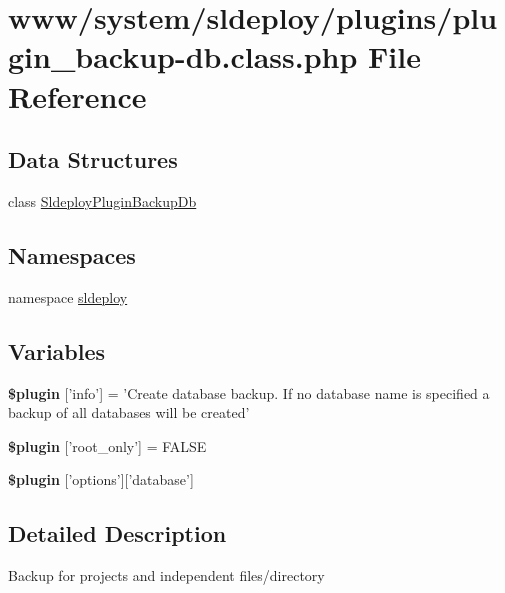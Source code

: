 \hypertarget{plugin__backup-db_8class_8php}{
\section{www/system/sldeploy/plugins/plugin\_\-backup-\/db.class.php File Reference}
\label{plugin__backup-db_8class_8php}
}
\subsection*{Data Structures}
\begin{DoxyCompactItemize}
\item 
class \hyperlink{class_sldeploy_plugin_backup_db}{SldeployPluginBackupDb}
\end{DoxyCompactItemize}
\subsection*{Namespaces}
\begin{DoxyCompactItemize}
\item 
namespace \hyperlink{namespacesldeploy}{sldeploy}
\end{DoxyCompactItemize}
\subsection*{Variables}
\begin{DoxyCompactItemize}
\item 
\hypertarget{plugin__backup-db_8class_8php_a95edf69ebbeaeedb03bab3bb010f2af9}{
{\bfseries \$plugin} \mbox{[}'info'\mbox{]} = 'Create database backup. If no database name is specified a backup of all databases will be created'}
\label{plugin__backup-db_8class_8php_a95edf69ebbeaeedb03bab3bb010f2af9}

\item 
\hypertarget{plugin__backup-db_8class_8php_a1d302084fa15e3efe6c843cbb5096985}{
{\bfseries \$plugin} \mbox{[}'root\_\-only'\mbox{]} = FALSE}
\label{plugin__backup-db_8class_8php_a1d302084fa15e3efe6c843cbb5096985}

\item 
{\bfseries \$plugin} \mbox{[}'options'\mbox{]}\mbox{[}'database'\mbox{]}
\end{DoxyCompactItemize}


\subsection{Detailed Description}
Backup for projects and independent files/directory

